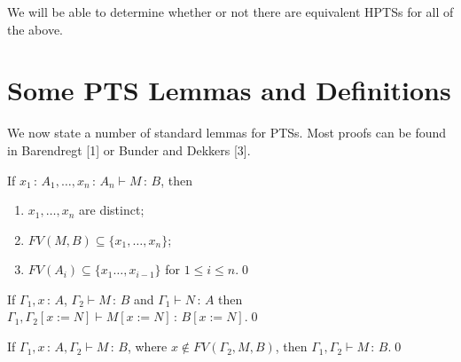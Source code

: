 \documentclass{LMCS}
\def\:{\mathbin{\,:\,}}
\begin{document}
  We will be able to determine whether or not there are equivalent
  HPTSs for all of the above.

\section{Some PTS Lemmas and Definitions}\label{S:PTSLD}

 \noindent We now state a number of standard lemmas for PTSs.  Most
  proofs can be found in Barendregt [1] or Bunder and Dekkers [3].

\begin{lem}\label{L:one}

  If $x_1\:A_1,\ldots,x_n\:A_n\vdash M\:B$, then
\begin{enumerate}[\em(i)]
\item $x_1,\ldots,x_n$ are distinct;
\item $FV(M,B)\subseteq\{x_1,\ldots,x_n\}$;
\item $FV(A_i)\subseteq\{x_1\ldots,x_{i-1}\}$ for $1\leq i\leq n$.\qed
\end{enumerate}
\end{lem}

\begin{lem}\label{L:two}

  If $\Gamma_1,x\:A$, $\Gamma_2\vdash M\:B$ and $\Gamma_1\vdash N\:A$
  then $\Gamma_1,\Gamma_2[x:=N]\vdash M[x:=N]\:B[x:=N]$.\qed
\end{lem}

\begin{lem}\label{L:three}

  If $\Gamma_1, x\:A,\Gamma_2\vdash M\:B$, where $x\notin FV(\Gamma_2,
  M,B)$, then $\Gamma_1,\Gamma_2\vdash M\:B$.\qed
\end{lem}
\end{document}
